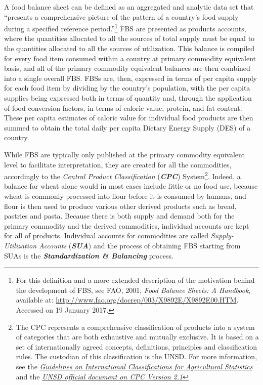 \documentclass[]{article}
\let\rmarkdownfootnote\footnote%
\def\footnote{\protect\rmarkdownfootnote}
\begin{document}
A food balance sheet can be defined as an aggregated and analytic data
set that ``presents a comprehensive picture of the pattern of a
country's food supply during a specified reference period.''\footnote{For
  this definition and a more extended description of the motivation
  behind the development of FBS, see FAO, 2001, \emph{Food Balance
  Sheets: A Handbook}, available at:
  \url{http://www.fao.org/docrep/003/X9892E/X9892E00.HTM}. Accessed on
  19 January 2017.} FBS are presented as products accounts, where the
quantities allocated to all the sources of total supply must be equal to
the quantities allocated to all the sources of utilization. This balance
is compiled for every food item consumed within a country at primary
commodity equivalent basis, and all of the primary commodity equivalent
balances are then combined into a single overall FBS. FBSs are, then,
expressed in terms of per capita supply for each food item by dividing
by the country's population, with the per capita supplies being
expressed both in terms of quantity and, through the application of food
conversion factors, in terms of caloric value, protein, and fat content.
These per capita estimates of caloric value for individual food products
are then summed to obtain the total daily per capita Dietary Energy
Supply (DES) of a country.

While FBS are typically only published at the primary commodity
equivalent level to facilitate interpretation, they are created for all
the commodities, accordingly to the \emph{Central Product
Classification} (\textbf{\emph{CPC}}) System\footnote{The CPC represents
  a comprehensive classification of products into a system of categories
  that are both exhaustive and mutually exclusive. It is based on a set
  of internationally agreed concepts, definitions, principles and
  classification rules. The custodian of this classification is the
  UNSD. For more information, see the
  \href{http://gsars.org/wp-content/uploads/2015/12/Guidelines-for-Int-Classifications-on-Agricultural-Statistics-web.pdf}{\emph{Guidelines
  on International Classifications for Agricultural Statistics}} and the
  \href{https://unstats.un.org/unsd/cr/downloads/CPCv2.1_complete\%28PDF\%29_English.pdf}{\emph{UNSD
  official document on CPC Version 2.1}}}. Indeed, a balance for wheat
alone would in most cases include little or no food use, because wheat
is commonly processed into flour before it is consumed by humans, and
flour is then used to produce various other derived products such as
bread, pastries and pasta. Because there is both supply and demand both
for the primary commodity and the derived commodities, individual
accounts are kept for all of products. Individual accounts for
commodities are called \emph{Supply-Utilization Accounts}
(\textbf{\emph{SUA}}) and the process of obtaining FBS starting from
SUAs is the \textbf{\emph{Standardization \& Balancing}} process.
\end{document}
